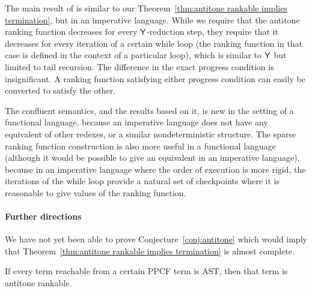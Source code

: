 The main result of \cite{DBLP:journals/pacmpl/McIverMKK18} is similar to our Theorem~\ref{thm:antitone rankable implies termination}, but in an imperative language. While we require that the antitone ranking function decreases for every $\mathsf{Y}$-reduction step, they require that it decreases for every iteration of a certain while loop (the ranking function in that case is defined in the context of a particular loop), which is similar to $\mathsf{Y}$ but limited to tail recursion. 
The difference in the exact progress condition is insignificant. A ranking function satisfying either progress condition can easily be converted to satisfy the other.

The confluent semantics, and the results based on it, is new in the setting of a functional language, because an imperative language does not have any equivalent of other redexes, or a similar nondeterministic structure. The sparse ranking function construction is also more useful in a functional language (although it would be possible to give an equivalent in an imperative language), because in an imperative language where the order of execution is more rigid, the iterations of the while loop provide a natural set of checkpoints where it is reasonable to give values of the ranking function.

\paragraph*{Further directions} We have not yet been able to prove Conjecture~\ref{conj:antitone} which would imply that Theorem~\ref{thm:antitone rankable implies termination} is almost complete.
\begin{conjecture}[Completeness]
\label{conj:antitone}
If every term reachable from a certain PPCF term is AST, then that term is antitone rankable.
\end{conjecture}

